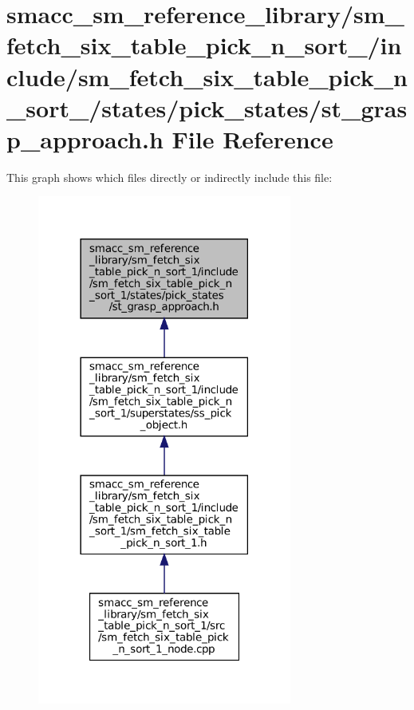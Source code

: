\hypertarget{sm__fetch__six__table__pick__n__sort__1_2include_2sm__fetch__six__table__pick__n__sort__1_2state17c8bd6d4c318521df2bd0320da85172}{}\section{smacc\+\_\+sm\+\_\+reference\+\_\+library/sm\+\_\+fetch\+\_\+six\+\_\+table\+\_\+pick\+\_\+n\+\_\+sort\+\_/include/sm\+\_\+fetch\+\_\+six\+\_\+table\+\_\+pick\+\_\+n\+\_\+sort\+\_/states/pick\+\_\+states/st\+\_\+grasp\+\_\+approach.h File Reference}
\label{sm__fetch__six__table__pick__n__sort__1_2include_2sm__fetch__six__table__pick__n__sort__1_2state17c8bd6d4c318521df2bd0320da85172}
This graph shows which files directly or indirectly include this file\+:
\nopagebreak
\begin{figure}[H]
\begin{center}
\leavevmode
\includegraphics[width=237pt]{sm__fetch__six__table__pick__n__sort__1_2include_2sm__fetch__six__table__pick__n__sort__1_2state7be153ec07bf7e8e74cfc11ed2570999}
\end{center}
\end{figure}
